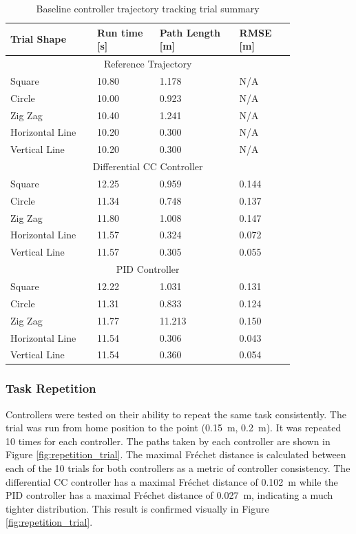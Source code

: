 \begin{table}[h]
    \centering   
    \caption{Baseline controller trajectory tracking trial summary}
    \begin{tabular}{p{0.25\linewidth} | p{0.18\linewidth} | p{0.23\linewidth} | p{0.16\linewidth}}
        \textbf{Trial Shape} & \textbf{Run time [s]} & \textbf{Path Length [m]} & \textbf{RMSE [m]} \\
        \hline
        \multicolumn{4}{c}{Reference Trajectory} \\
        \hline
        Square & 10.80 & 1.178 & N/A\\
        Circle & 10.00 & 0.923 & N/A\\
        Zig Zag & 10.40 & 1.241 & N/A\\
        Horizontal Line & 10.20 & 0.300 & N/A\\
        Vertical Line & 10.20 & 0.300 & N/A\\
        \hline
        \multicolumn{4}{c}{Differential CC Controller} \\
        \hline
        Square & 12.25 & 0.959 & 0.144 \\
        Circle & 11.34 & 0.748 & 0.137 \\
        Zig Zag & 11.80 & 1.008 & 0.147 \\
        Horizontal Line & 11.57 & 0.324 & 0.072 \\
        Vertical Line & 11.57 & 0.305 & 0.055 \\
        \hline
        \multicolumn{4}{c}{PID Controller} \\
        \hline
        Square & 12.22 & 1.031 & 0.131 \\
        Circle & 11.31 & 0.833 & 0.124 \\
        Zig Zag & 11.77 & 11.213 & 0.150 \\
        Horizontal Line & 11.54 & 0.306 & 0.043 \\
        Vertical Line & 11.54 & 0.360 & 0.054 \\
        \hline
    \end{tabular}
    \label{tab:baseline_test_traj}
\end{table}


\subsubsection{Task Repetition}
Controllers were tested on their ability to repeat the same task consistently. The trial was run from home position to the point (\SI{0.15}{m}, \SI{0.2}{m}). It was repeated 10 times for each controller. The paths taken by each controller are shown in Figure \ref{fig:repetition_trial}. The maximal Fréchet distance \cite{frechet_distance} is calculated between each of the 10 trials for both controllers as a metric of controller consistency. The differential CC controller has a maximal Fréchet distance of \SI{0.102}{m} while the PID controller has a maximal Fréchet distance of \SI{0.027}{m}, indicating a much tighter distribution. This result is confirmed visually in Figure \ref{fig:repetition_trial}. 


